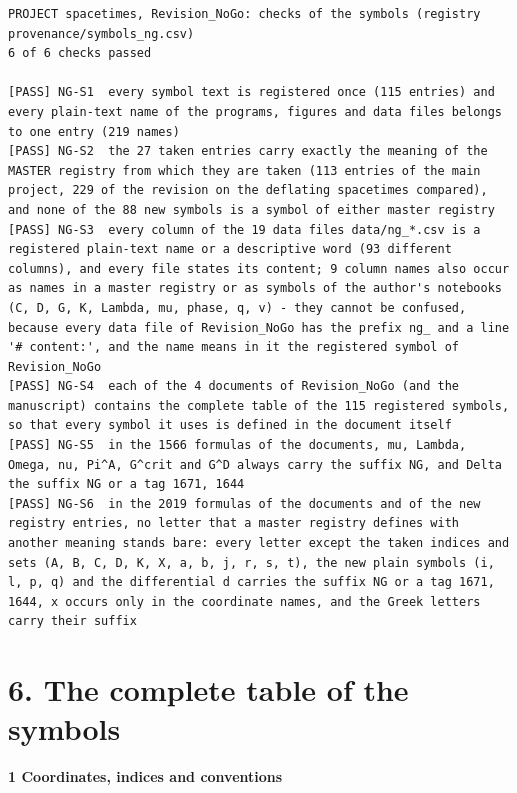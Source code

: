 \documentclass[
  10pt,
]{article}
\begin{document}
\begin{verbatim}
PROJECT spacetimes, Revision_NoGo: checks of the symbols (registry provenance/symbols_ng.csv)
6 of 6 checks passed

[PASS] NG-S1  every symbol text is registered once (115 entries) and every plain-text name of the programs, figures and data files belongs to one entry (219 names)
[PASS] NG-S2  the 27 taken entries carry exactly the meaning of the MASTER registry from which they are taken (113 entries of the main project, 229 of the revision on the deflating spacetimes compared), and none of the 88 new symbols is a symbol of either master registry
[PASS] NG-S3  every column of the 19 data files data/ng_*.csv is a registered plain-text name or a descriptive word (93 different columns), and every file states its content; 9 column names also occur as names in a master registry or as symbols of the author's notebooks (C, D, G, K, Lambda, mu, phase, q, v) - they cannot be confused, because every data file of Revision_NoGo has the prefix ng_ and a line '# content:', and the name means in it the registered symbol of Revision_NoGo
[PASS] NG-S4  each of the 4 documents of Revision_NoGo (and the manuscript) contains the complete table of the 115 registered symbols, so that every symbol it uses is defined in the document itself
[PASS] NG-S5  in the 1566 formulas of the documents, mu, Lambda, Omega, nu, Pi^A, G^crit and G^D always carry the suffix NG, and Delta the suffix NG or a tag 1671, 1644
[PASS] NG-S6  in the 2019 formulas of the documents and of the new registry entries, no letter that a master registry defines with another meaning stands bare: every letter except the taken indices and sets (A, B, C, D, K, X, a, b, j, r, s, t), the new plain symbols (i, l, p, q) and the differential d carries the suffix NG or a tag 1671, 1644, x occurs only in the coordinate names, and the Greek letters carry their suffix
\end{verbatim}

\hypertarget{the-complete-table-of-the-symbols}{%
\section{6. The complete table of the
symbols}\label{the-complete-table-of-the-symbols}}

\textbf{1 Coordinates, indices and conventions}
\end{document}
